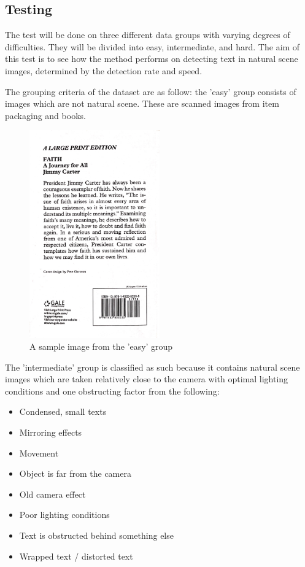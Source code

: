 \documentclass[10pt, a4paper]{article}
\begin{document}
\clearpage

\subsection{Testing} %
\label{sub:testing}
The test will be done on three different data groups with varying degrees of difficulties. They will be divided into easy, intermediate, and hard. The aim of this test is to see how the method performs on detecting text in natural scene images, determined by the detection rate and speed.

The grouping criteria of the dataset are as follow: the 'easy' group consists of images which are not natural scene. These are scanned images from item packaging and books.
\begin{figure}[hbt!]
	\centering
	\includegraphics[width=0.5\textwidth]{img/sampleeasy.JPG}
	\caption{A sample image from the 'easy' group}
	\label{fig:sampleeasy}
\end{figure}

The 'intermediate' group is classified as such because it contains natural scene images which are taken relatively close to the camera with optimal lighting conditions and one obstructing factor from the following:
\begin{itemize}
	\item Condensed, small texts
	\item Mirroring effects
	\item Movement
	\item Object is far from the camera
	\item Old camera effect
	\item Poor lighting conditions
	\item Text is obstructed behind something else
	\item Wrapped text / distorted text
\end{itemize}
\end{document}
